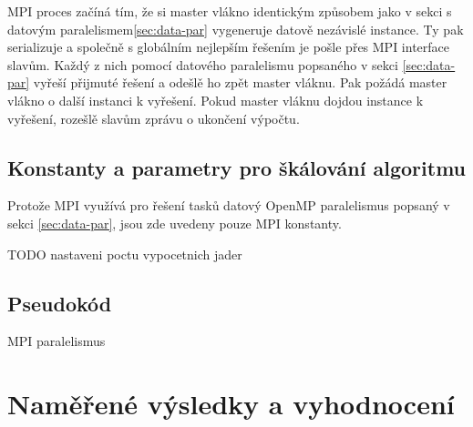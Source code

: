 \documentclass{article}
\begin{document}
    MPI proces začíná tím, že si master vlákno identickým způsobem jako v sekci s datovým paralelismem\ref{sec:data-par}
    vygeneruje datově nezávislé instance. Ty pak serializuje a společně s globálním nejlepším řešením je
    pošle přes MPI interface slavům. Každý z nich pomocí datového paralelismu popsaného v sekci \ref{sec:data-par}
    vyřeší přijmuté řešení a odešlě ho zpět master vláknu. Pak požádá master vlákno o další instanci k vyřešení.
    Pokud master vláknu dojdou instance k vyřešení, rozešlě slavům zprávu o ukončení výpočtu.

    \subsection{Konstanty a parametry pro škálování algoritmu}
    Protože MPI využívá pro řešení tasků datový OpenMP paralelismus popsaný v sekci \ref{sec:data-par}, jsou
    zde uvedeny pouze MPI konstanty.

    TODO nastaveni poctu vypocetnich jader

    \subsection{Pseudokód}

    \begin{algorithm}[H]
        \SetAlgoLined

        \BlankLine

        \;
        \caption{MPI paralelismus}
        \label{alg:mpi}
    \end{algorithm}


    \section{Naměřené výsledky a vyhodnocení}
\end{document}
